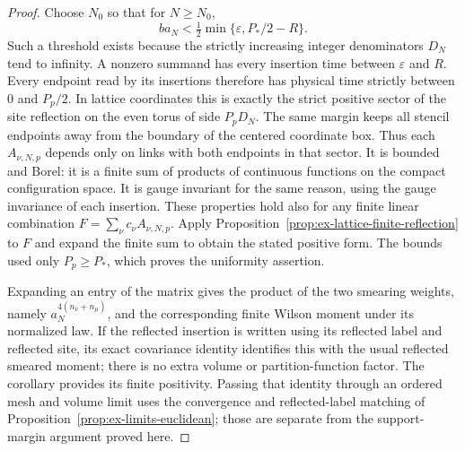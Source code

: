 \begin{proof}
Choose $N_0$ so that for $N\ge N_0$,
\[
 b a_N<\tfrac12\min\{\varepsilon,P_*/2-R\}.
\]
Such a threshold exists because the strictly increasing integer
 denominators $D_N$ tend to infinity. A nonzero summand has every
insertion time between $\varepsilon$ and $R$. Every endpoint read by
its insertions therefore has physical time strictly between $0$ and
$P_p/2$. In lattice coordinates this is exactly the strict positive
sector of the site reflection on the even torus of side $P_pD_N$.
The same margin keeps all stencil endpoints away from the boundary of
the centered coordinate box. Thus each $A_{\nu,N,p}$ depends only on
links with both endpoints in that sector. It is bounded and Borel:
it is a finite sum of products of continuous functions on the compact
configuration space. It is gauge invariant for the same reason, using
the gauge invariance of each insertion. These properties hold also for
any finite linear combination $F=\sum_\nu c_\nu A_{\nu,N,p}$.
Apply Proposition~\ref{prop:ex-lattice-finite-reflection} to $F$ and
expand the finite sum to obtain the stated positive form. The bounds
used only $P_p\ge P_*$, which proves the uniformity assertion.

Expanding an entry of the matrix gives the product of the two smearing
weights, namely $a_N^{4(n_\nu+n_\mu)}$, and the corresponding finite
Wilson moment under its normalized law. If the reflected insertion is
written using its reflected label and reflected site, its exact
covariance identity identifies this with the usual reflected smeared
moment; there is no extra volume or partition-function factor. The
corollary provides its finite positivity. Passing that identity through
an ordered mesh and volume limit uses the convergence and reflected-label
matching of Proposition~\ref{prop:ex-limits-euclidean}; those are separate
from the support-margin argument proved here.
\end{proof}
